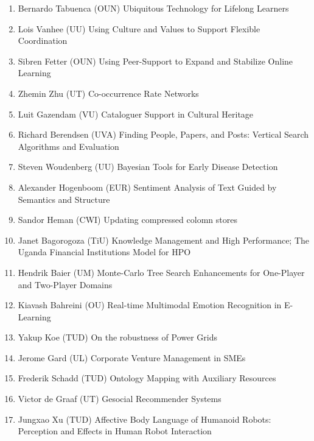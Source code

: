 \begin{multicols}{2}
\begin{scriptsize}
\begin{enumerate}[leftmargin=*,noitemsep,topsep=0pt,parsep=1pt,partopsep=0pt]
\item Bernardo Tabuenca (OUN) Ubiquitous Technology for Lifelong Learners
\item Lois Vanhee (UU) Using Culture and Values to Support Flexible Coordination 
\item Sibren Fetter (OUN) Using Peer-Support to Expand and Stabilize Online Learning
\item Zhemin Zhu (UT) Co-occurrence Rate Networks
\item Luit Gazendam (VU) Cataloguer Support in Cultural Heritage
\item Richard Berendsen (UVA) Finding People, Papers, and Posts: Vertical Search Algorithms and Evaluation
\item Steven Woudenberg (UU) Bayesian Tools for Early Disease Detection 
\item Alexander Hogenboom (EUR) Sentiment Analysis of Text Guided by Semantics and Structure
\item Sandor Heman (CWI) Updating compressed colomn stores
\item Janet Bagorogoza (TiU) Knowledge Management and High Performance; The Uganda Financial Institutions Model for HPO
\item Hendrik Baier (UM) Monte-Carlo Tree Search Enhancements for One-Player and Two-Player Domains
\item Kiavash Bahreini (OU) Real-time Multimodal Emotion Recognition in E-Learning
\item Yakup Koe (TUD) On the robustness of Power Grids
\item Jerome Gard (UL) Corporate Venture Management in SMEs
\item Frederik Schadd (TUD) Ontology Mapping with Auxiliary Resources
\item Victor de Graaf (UT) Gesocial Recommender Systems
\item Jungxao Xu (TUD) Affective Body Language of Humanoid Robots: Perception and Effects in Human Robot Interaction
\end{enumerate}


\end{scriptsize}
\end{multicols}
